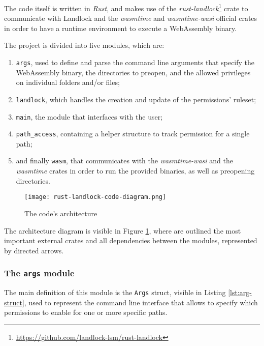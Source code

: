 The code itself is written in \textit{Rust}, and makes use of the
\textit{rust-landlock}\footnote{\url{https://github.com/landlock-lsm/rust-landlock}} crate
to communicate with Landlock and the \textit{wasmtime} and \textit{wasmtime-wasi} official
crates in order to have a runtime environment to execute a WebAssembly binary.

The project is divided into five modules, which are:
\begin{enumerate}
  \item \texttt{args}, used to define and parse the command line arguments that specify the WebAssembly binary,
        the directories to preopen, and the allowed privileges on individual folders and/or files;
  \item \texttt{landlock}, which handles the creation and update of the permissions' ruleset;
  \item \texttt{main}, the module that interfaces with the user;
  \item \texttt{path\_access}, containing a helper structure to track permission for a single path;
  \item and finally \texttt{wasm}, that communicates with the \textit{wasmtime-wasi} and the \textit{wasmtime} crates
        in order to run the provided binaries, as well as preopening directories.
\end{enumerate}

\begin{figure}[ht]
  \centering
  \texttt{[image: rust-landlock-code-diagram.png]}
  \caption{The code's architecture}
  \label{fig:rust-landlock-code-architecture}
\end{figure}

The architecture diagram is visible in Figure \ref{fig:rust-landlock-code-architecture}, where
are outlined the most important external crates and all dependencies between the modules, represented
by directed arrows.

\subsubsection{The \texttt{args} module}
\label{sec:landlock-args-module}

The main definition of this module is the \texttt{Args} struct, visible in Listing \ref{lst:arg-struct},
used to represent the command line interface that allows to specify which permissions to enable
for one or more specific paths.

